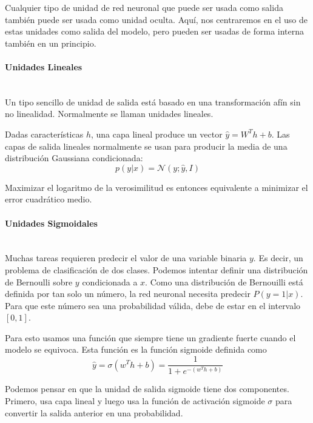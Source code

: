 Cualquier tipo de unidad de red neuronal que puede ser usada como salida también puede ser usada como unidad oculta. Aquí, nos centraremos en el uso de estas unidades como salida del modelo, pero pueden ser usadas de forma interna también en un principio.

\paragraph{Unidades Lineales}\mbox{}\\
Un tipo sencillo de unidad de salida está basado en una transformación afín sin no linealidad. Normalmente se llaman unidades lineales.

Dadas características $h$, una capa lineal produce un vector $\hat{y}=W^Th + b$. Las capas de salida lineales normalmente se usan para producir la media de una distribución Gaussiana condicionada:
\begin{equation}
    p(y | x) = \mathcal{N}(y; \hat{y}, I)
\end{equation}

Maximizar el logaritmo de la verosimilitud es entonces equivalente a minimizar el error cuadrático medio.

\paragraph{Unidades Sigmoidales}\mbox{}\\
Muchas tareas requieren predecir el valor de una variable binaria $y$. Es decir, un problema de clasificación de dos clases. Podemos intentar definir una distribución de Bernoulli sobre $y$ condicionada a $x$. Como una distribución de Bernouilli está definida por tan solo un número, la red neuronal necesita predecir $P(y=1 | x)$. Para que este número sea una probabilidad válida, debe de estar en el intervalo $[0, 1]$.

Para esto usamos una función que siempre tiene un gradiente fuerte cuando el modelo se equivoca. Esta función es la función sigmoide definida como
\begin{equation}
    \hat{y} = \sigma(w^Th + b) = \frac{1}{1 + e^{-(w^Th + b)}}
\end{equation}

Podemos pensar en que la unidad de salida sigmoide tiene dos componentes. Primero, usa capa lineal y luego usa la función de activación sigmoide $\sigma$ para convertir la salida anterior en una probabilidad.

